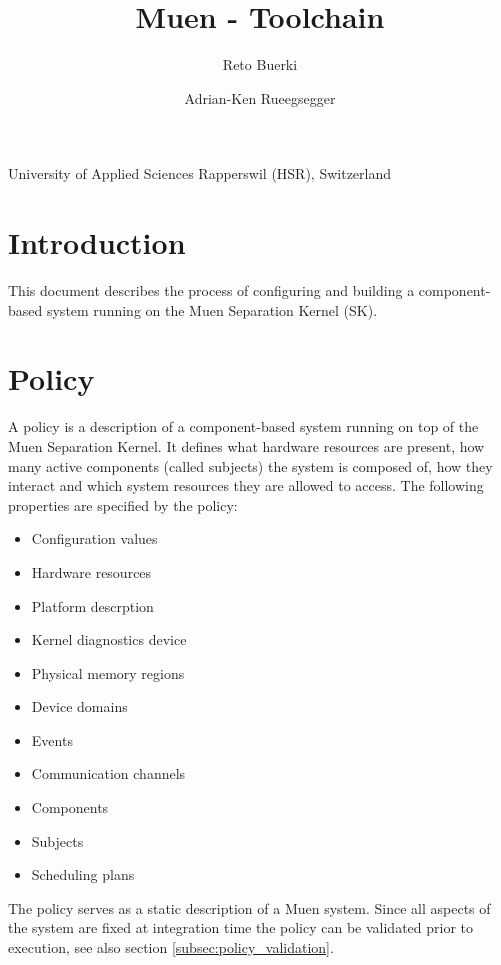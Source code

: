 \documentclass[a4paper,twoside,titlepage]{article}
\title{Muen - Toolchain}
\author{Reto Buerki \and Adrian-Ken Rueegsegger}
\begin{document}


\maketitle

\begin{center}
	University of Applied Sciences Rapperswil (HSR), Switzerland
\end{center}
\clearpage

\tableofcontents
\listoffigures

\section{Introduction}
This document describes the process of configuring and building a
component-based system running on the Muen Separation Kernel (SK).

\section{Policy}
A policy is a description of a component-based system running on top of the Muen
Separation Kernel. It defines what hardware resources are present, how many
active components (called subjects) the system is composed of, how they interact
and which system resources they are allowed to access. The following properties
are specified by the policy:

\begin{itemize}
	\item Configuration values
	\item Hardware resources
	\item Platform descrption
	\item Kernel diagnostics device
	\item Physical memory regions
	\item Device domains
	\item Events
	\item Communication channels
	\item Components
	\item Subjects
	\item Scheduling plans
\end{itemize}

The policy serves as a static description of a Muen system. Since all aspects of
the system are fixed at integration time the policy can be validated prior to
execution, see also section \ref{subsec:policy_validation}.
\end{document}
